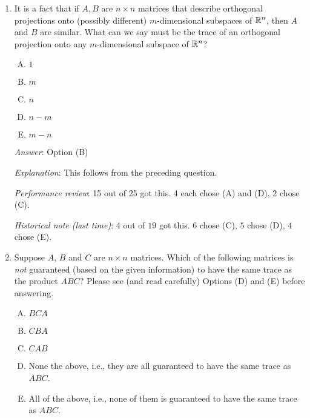 \documentclass[10pt]{amsart}
\begin{document}
\begin{enumerate}
  {\em Answer}: Option (B)

  {\em Explanation}: The matrix is diagonal with the first $m$
  diagonal entries equal to $1$ and the remaining $n - m$ diagonal
  entries equal to $0$. The trace is thus $m$.

  {\em Performance review}: 19 out of 25 got this. 3 each chose (D)
  and (E).

  {\em Historical note (last time)}: $9$ out of $19$ got this. $5$ chose (D),
  $4$ chose (E), $1$ chose (C).

\item It is a fact that if $A,B$ are $n \times n$ matrices that
  describe orthogonal projections onto (possibly different)
  $m$-dimensional subspaces of $\mathbb{R}^n$, then $A$ and $B$ are
  similar. What can we say must be the trace of an orthogonal
  projection onto any $m$-dimensional subspace of $\mathbb{R}^n$?

  \begin{enumerate}[(A)]
  \item $1$
  \item $m$
  \item $n$
  \item $n - m$
  \item $m - n$
  \end{enumerate}

  {\em Answer}: Option (B)

  {\em Explanation}: This follows from the preceding question.

  {\em Performance review}: 15 out of 25 got this. 4 each chose (A)
  and (D), 2 chose (C).

  {\em Historical note (last time)}: $4$ out of $19$ got this. $6$ chose (C),
  $5$ chose (D), $4$ chose (E).

\item Suppose $A$, $B$ and $C$ are $n \times n$ matrices. Which of the
  following matrices is {\em not} guaranteed (based on the given
  information) to have the same trace as the product $ABC$? Please see
  (and read carefully) Options (D) and (E) before answering.

  \begin{enumerate}[(A)]
  \item $BCA$
  \item $CBA$
  \item $CAB$
  \item None the above, i.e., they are all guaranteed to have the same
    trace as $ABC$.
  \item All of the above, i.e., none of them is guaranteed to have the
    same trace as $ABC$.
  \end{enumerate}


\end{enumerate}
\end{document}
